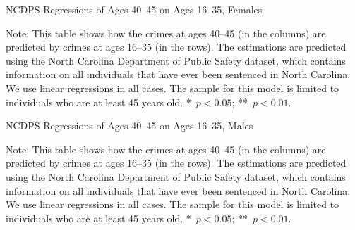 \begin{table}
\caption{NCDPS Regressions of Ages 40--45 on Ages 16--35, Females} \label{tab:reg2f}
\begin{adjustbox}{max width=\textwidth}
\begin{threeparttable}

\begin{tablenotes}
\item Note: This table shows how the crimes at ages 40--45 (in the columns) are predicted by crimes at ages 16--35 (in the rows). The estimations are predicted using the North Carolina Department of Public Safety dataset, which contains information on all individuals that have ever been sentenced in North Carolina. We use linear regressions in all cases. The sample for this model is limited to individuals who are at least 45 years old. *~$p<0.05$; **~$p<0.01$.
\end{tablenotes}
\end{threeparttable}
\end{adjustbox}
\end{table}


\begin{table}
\caption{NCDPS Regressions of Ages 40--45 on Ages 16--35, Males} \label{tab:reg2m}
\begin{adjustbox}{max width=\textwidth}
\begin{threeparttable}

\begin{tablenotes}
\item Note: This table shows how the crimes at ages 40--45 (in the columns) are predicted by crimes at ages 16--35 (in the rows). The estimations are predicted using the North Carolina Department of Public Safety dataset, which contains information on all individuals that have ever been sentenced in North Carolina. We use linear regressions in all cases. The sample for this model is limited to individuals who are at least 45 years old. *~$p<0.05$; **~$p<0.01$.
\end{tablenotes}
\end{threeparttable}
\end{adjustbox}
\end{table}

